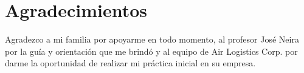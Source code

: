 \chapter*{Agradecimientos}
\fancyhf{}
\fancyfoot[R]{\thepage} 

Agradezco a mi familia por apoyarme en todo momento, al profesor José Neira por la guía y orientación que me brindó y al equipo de Air Logistics Corp. por darme la oportunidad de realizar mi práctica inicial en su empresa.